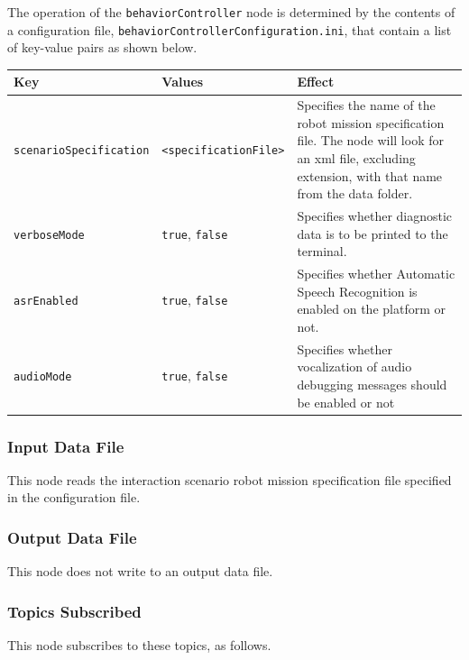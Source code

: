 \documentclass{CSSRforAfrica}
\begin{document}
The operation of the {\small \verb+behaviorController+} node is determined by the contents of a configuration file,  {\small \verb+behaviorControllerConfiguration.ini+},  that  contain a list of key-value pairs as shown below.  
 
\begin{center}
\begin{tabularx}{\linewidth}{| l | l | X|}
\hline 
{\small Key }                               & {\small Values }                                                 &  {\small Effect}       \\
\hline
{\footnotesize \verb+scenarioSpecification+}  & {\footnotesize \verb+<specificationFile>+}     & {\small Specifies the name of the robot mission specification file. The node will look for an xml file, excluding extension, with that name from the data folder.} \\
\hline
{\footnotesize \verb+verboseMode+}  & {\footnotesize \verb+true+, \verb+false+}     & {\small Specifies whether diagnostic data is to be printed to the terminal.} \\
\hline
{\footnotesize \verb+asrEnabled+}  & {\footnotesize \verb+true+, \verb+false+}     & {\small Specifies whether Automatic Speech Recognition is enabled on the platform or not.} \\
\hline
{\footnotesize \verb+audioMode+}  & {\footnotesize \verb+true+, \verb+false+}     & {\small Specifies whether vocalization of audio debugging messages should be enabled or not} \\
\hline
\end{tabularx}
\end{center}

\subsubsection*{Input Data File}
This node reads the interaction scenario robot mission specification file specified in the configuration file.


\subsubsection*{Output Data File}
This node does not write to an output data file.


\subsubsection*{Topics Subscribed}
This node  subscribes to these topics, as follows. 
\end{document}
